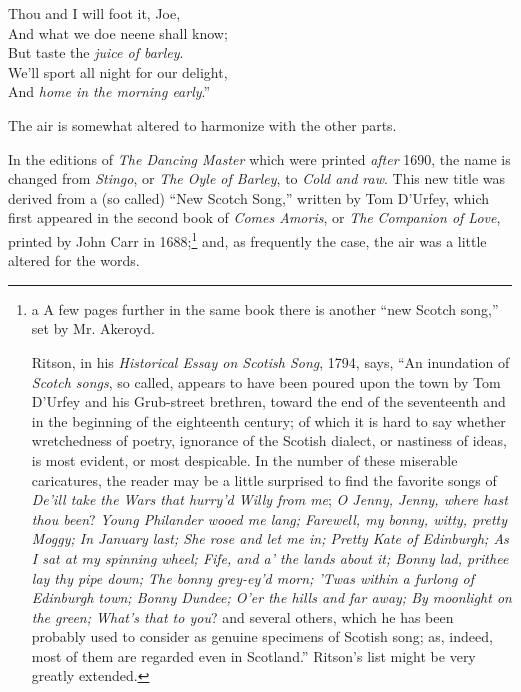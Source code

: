 \settowidth{\versewidth}{And what we doe neene shall know;}
\begin{scverse}
\begin{patverse}
Thou and I will foot it, Joe,\\
And what we doe neene shall know;\\
But taste the \textit{juice of barley}.\\
We’ll sport all night for our delight,\\
And \textit{home in the morning early}.”
\end{patverse}
\end{scverse}

The air is somewhat altered to harmonize with the other parts.

In the editions of \textit{The Dancing Master} which were printed \textit{after} 1690, the
name is changed from \textit{Stingo}, or \textit{The Oyle of Barley}, to \textit{Cold and raw}. This new
title was derived from a (so called) “New Scotch Song,” written by Tom
D’Urfey, which first appeared in the second \pagebreak book of \textit{Comes Amoris}, or \textit{The}
\textit{Companion of Love}, printed by John Carr in 1688;\footnote{\textit{}
a A few pages further in the same book there is another
“new Scotch song,” set by Mr. Akeroyd.

Ritson, in his \textit{Historical Essay on Scotish Song}, 1794,
says, “An inundation of \textit{Scotch songs}, so called, appears
to have been poured upon the town by Tom D’Urfey and
his Grub-street brethren, toward the end of the seventeenth
and in the beginning of the eighteenth century; of
which it is hard to say whether wretchedness of poetry,
ignorance of the Scotish dialect, or nastiness of ideas, is
most evident, or most despicable. In the number of
these miserable caricatures, the reader may be a little surprised
to find the favorite songs of \textit{De’ill take the Wars
that hurry'd Willy from me}; \textit{O Jenny, Jenny, where hast thou
been}? \textit{Young Philander wooed me lang; Farewell, my
bonny, witty, pretty Moggy; In January last; She rose and
let me in; Pretty Kate of Edinburgh; As I sat at my spinning
wheel; Fife, and a’ the lands about it; Bonny lad,
prithee lay thy pipe down; The bonny grey-ey'd morn;
’Twas within a furlong of Edinburgh town; Bonny Dundee;
O'er the hills and far away; By moonlight on the green;
What’s that to you}? and several others, which he has
been probably used to consider as genuine specimens of
Scotish song; as, indeed, most of them are regarded
even in Scotland.” Ritson's list might be very greatly
extended.}
 and, as frequently the case,
the air was a little altered for the words.

